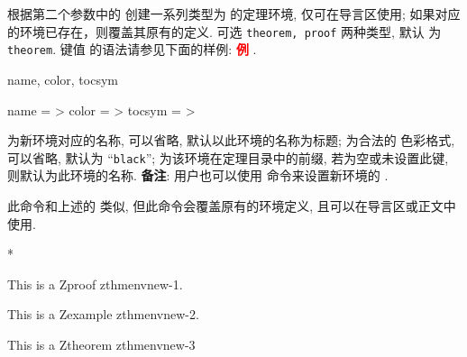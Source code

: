 \begin{function}[added=2025-09-23]{\zthmenvnew}
  \begin{syntax}
  \end{syntax}
  根据第二个参数中的  创建一系列类型为  的定理环境, 仅可在导言区使用; 
  如果对应的环境已存在，则覆盖其原有的定义.  可选 \texttt{theorem, proof} 两种类型, 默认
  为 \texttt{theorem}. 键值  的语法请参见下面的样例:
  \textcolor{red}{\bfseries 例 }.
\end{function}


\begin{keyval}[parent=ztex/thmnew]{name, color, tocsym}
  \begin{syntax}
    name   =  > 
    color  =  > 
    tocsym =  > 
  \end{syntax}
   为新环境对应的名称, 可以省略, 默认以此环境的名称为标题; 
   为合法的 \ztex{} 色彩格式, 可以省略, 默认为 ``\texttt{black}'';
   为该环境在定理目录中的前缀, 若为空或未设置此键, 则默认为此环境的名称.
  \textbf{备注}: 用户也可以使用 \cmd{\zthmtocsym} 命令来设置新环境的 .
\end{keyval}


\begin{function}[added=2025-09-23]{\zthmenvset}
  \begin{syntax}
    \cmd{\zthmenvset}
  \end{syntax}
  此命令和上述的 \cmd{\zthmenvnew} 类似, 但此命令会覆盖原有的环境定义, 且可以在导言区或正文中使用.
\end{function}


\begin{DocExample}*
\begin{Zproof}[zthmenvnew-1]
  This is a Zproof zthmenvnew-1.
\end{Zproof}
\begin{Zexample}[zthmenvnew-2]
  This is a Zexample zthmenvnew-2.
\end{Zexample}
\begin{Ztheorem}[zthmenvnew-3]
  This is a Ztheorem zthmenvnew-3
\end{Ztheorem}
\end{DocExample}



